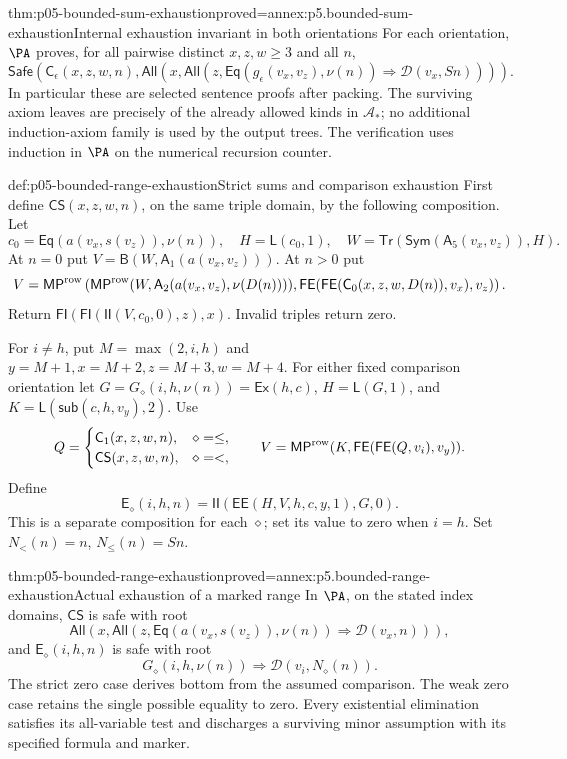 \begin{hblemma}{thm:p05-bounded-sum-exhaustion}{proved=annex:p5.bounded-sum-exhaustion}{Internal exhaustion invariant in both orientations}
For each orientation, \(\PA\) proves, for all pairwise distinct
\(x,z,w\geq3\) and all \(n\),
\[
 \mathsf{Safe}\left(\mathsf C_\epsilon(x,z,w,n),
  \mathsf{All}\left(x,\mathsf{All}\left(z,
    \mathsf{Eq}(g_\epsilon(v_x,v_z),\nu(n))
                       \Rightarrow\mathcal D(v_x,Sn)\right)\right)\right).
\]
In particular these are selected sentence proofs after packing. The
surviving axiom leaves are precisely of the already allowed kinds in
\(\mathcal A_*\); no additional induction-axiom family is used by the
output trees. The verification uses induction in \(\PA\) on the
numerical recursion counter.
\end{hblemma}

\begin{hbdefinition}{def:p05-bounded-range-exhaustion}{Strict sums and comparison exhaustion}
First define \(\mathsf{CS}(x,z,w,n)\), on the same triple domain, by
the following composition. Let
\[
 c_0=\mathsf{Eq}(a(v_x,s(v_z)),\nu(n)),\quad H=\mathsf L(c_0,1),\quad
 W=\mathsf{Tr}(\mathsf{Sym}(\mathsf A_5(v_x,v_z)),H).
\]
At \(n=0\) put \(V=\mathsf B(W,\mathsf A_1(a(v_x,v_z)))\).
At \(n>0\) put
\[
 V=\mathsf{MP}^{\rm row}\left(
    \mathsf{MP}^{\rm row}(W,\mathsf A_2(a(v_x,v_z),\nu(D(n)))),
    \mathsf{FE}(\mathsf{FE}(\mathsf C_0(x,z,w,D(n)),v_x),v_z)\right).
\]
Return \(\mathsf{FI}(\mathsf{FI}(\mathsf{II}(V,c_0,0),z),x)\).
Invalid triples return zero.

For \(i\ne h\), put \(M=\max(2,i,h)\) and
\(y=M+1,x=M+2,z=M+3,w=M+4\). For either fixed comparison
orientation let \(G=G_\diamond(i,h,\nu(n))=\mathsf{Ex}(h,c)\),
\(H=\mathsf L(G,1)\), and \(K=\mathsf L(\mathsf{sub}(c,h,v_y),2)\).
Use
\[
 Q=\begin{cases}
   \mathsf C_1(x,z,w,n),&\diamond=\leq,\\
   \mathsf{CS}(x,z,w,n),&\diamond=<,
 \end{cases}
\qquad
 V=\mathsf{MP}^{\rm row}(K,\mathsf{FE}(\mathsf{FE}(Q,v_i),v_y)).
\]
Define
\[
 \mathsf{E}_\diamond(i,h,n)
       =\mathsf{II}(\mathsf{EE}(H,V,h,c,y,1),G,0).
\]
This is a separate composition for each \(\diamond\); set its value to
zero when \(i=h\). Set \(N_<(n)=n\), \(N_{\leq}(n)=Sn\).
\end{hbdefinition}

\begin{hblemma}{thm:p05-bounded-range-exhaustion}{proved=annex:p5.bounded-range-exhaustion}{Actual exhaustion of a marked range}
In \(\PA\), on the stated index domains, \(\mathsf{CS}\) is safe with
root
\[
 \mathsf{All}(x,\mathsf{All}(z,
    \mathsf{Eq}(a(v_x,s(v_z)),\nu(n))\Rightarrow\mathcal D(v_x,n))),
\]
and \(\mathsf E_\diamond(i,h,n)\) is safe with root
\[
 G_\diamond(i,h,\nu(n))\Rightarrow
                        \mathcal D(v_i,N_\diamond(n)).
\]
The strict zero case derives bottom from the assumed comparison. The weak
zero case retains the single possible equality to zero. Every existential
elimination satisfies its all-variable test and discharges a surviving
minor assumption with its specified formula and marker.
\end{hblemma}

